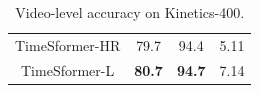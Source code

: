 \documentclass{article}
\newcommand{\LT}[1]{\textcolor{blue}{{\bf LT:} #1}}
\begin{document}
\begin{table}
\begin{center}
\begin{tabular}{c c c c }
  TimeSformer-HR  &  79.7 & 94.4 & 5.11 \\
 TimeSformer-L &\bf 80.7 & \bf 94.7 & 7.14 \\
 \hline
 \end{tabular}
 \end{center}
\vspace{-0.3cm}
\caption{{Video-level accuracy on Kinetics-400}. %
\vspace{-0.1cm}}%
\label{k400_results_table}
 \end{table}







 
 









\end{document}
